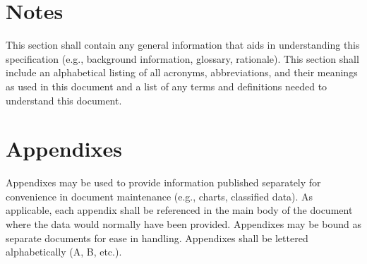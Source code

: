 \section{Notes}

This section shall contain any general information that aids in
understanding this specification (e.g., background information,
glossary, rationale). This section shall include an alphabetical listing
of all acronyms, abbreviations, and their meanings as used in this
document and a list of any terms and definitions needed to understand
this document.

\appendix

\section{Appendixes}

Appendixes may be used to provide information published separately for
convenience in document maintenance (e.g., charts, classified data). As
applicable, each appendix shall be referenced in the main body of the
document where the data would normally have been provided. Appendixes
may be bound as separate documents for ease in handling. Appendixes
shall be lettered alphabetically (A, B, etc.).
